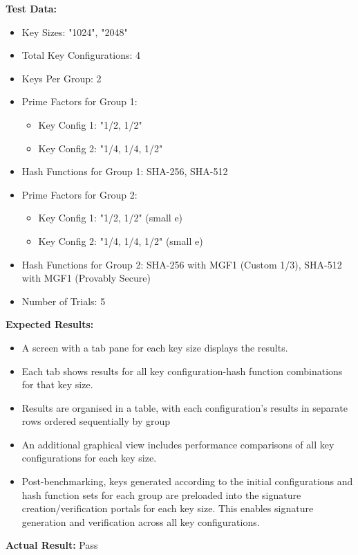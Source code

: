 \documentclass[]{final_report}
\theoremstyle{definition}
\begin{document}
\textbf{Test Data:}
\begin{itemize}
    \item Key Sizes: "1024", "2048"
    \item Total Key Configurations: 4
    \item Keys Per Group: 2
    \item Prime Factors for Group 1: 
        \begin{itemize}
            \item Key Config 1: "1/2, 1/2"
            \item Key Config 2: "1/4, 1/4, 1/2"
        \end{itemize}
    \item Hash Functions for Group 1: SHA-256, SHA-512
    \item Prime Factors for Group 2: 
        \begin{itemize}
            \item Key Config 1: "1/2, 1/2" (small e)
            \item Key Config 2: "1/4, 1/4, 1/2" (small e)
        \end{itemize}
    \item Hash Functions for Group 2: SHA-256 with MGF1 (Custom 1/3), SHA-512 with MGF1 (Provably Secure)
    \item Number of Trials: 5
\end{itemize}

\textbf{Expected Results:}
\begin{itemize}
    \item A screen with a tab pane for each key size displays the results.
    \item Each tab shows results for all key configuration-hash function combinations for that key size.
    \item Results are organised in a table, with each configuration's results in separate rows ordered sequentially by group
    \item An additional graphical view includes performance comparisons of all key configurations for each key size.
    \item Post-benchmarking, keys generated according to the initial configurations and hash function sets for each group are preloaded into the signature creation/verification portals for each key size. This enables signature generation and verification across all key configurations.
\end{itemize}

\textbf{Actual Result:} Pass
\end{document}
